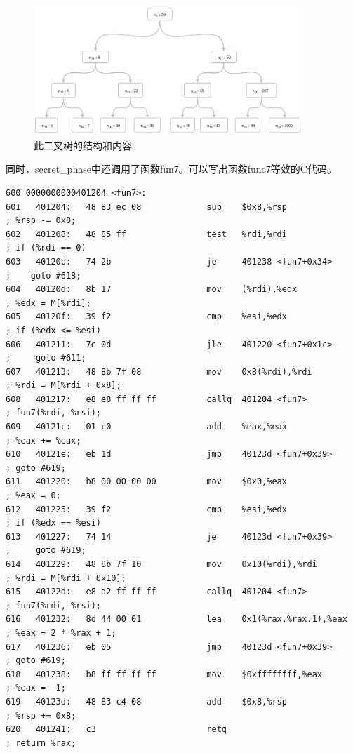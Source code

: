 \documentclass{article}
\begin{document}
\begin{figure}[H]
  \begin{center}
    \includegraphics[width=0.9\textwidth]{tree.png}
    \caption{此二叉树的结构和内容}
  \end{center}
\end{figure}

同时，secret\_phase中还调用了函数fun7。可以写出函数func7等效的C代码。

\begin{lstlisting}[title = fun7对应的反汇编代码及注释, xleftmargin = 2em,xrightmargin = 2em, aboveskip = 1em, numbers = none, basicstyle=\footnotesize\ttfamily]
600 0000000000401204 <fun7>:
601   401204:   48 83 ec 08             sub    $0x8,%rsp                    ; %rsp -= 0x8;
602   401208:   48 85 ff                test   %rdi,%rdi                    ; if (%rdi == 0)
603   40120b:   74 2b                   je     401238 <fun7+0x34>           ;    goto #618;
604   40120d:   8b 17                   mov    (%rdi),%edx                  ; %edx = M[%rdi];
605   40120f:   39 f2                   cmp    %esi,%edx                    ; if (%edx <= %esi)
606   401211:   7e 0d                   jle    401220 <fun7+0x1c>           ;     goto #611;
607   401213:   48 8b 7f 08             mov    0x8(%rdi),%rdi               ; %rdi = M[%rdi + 0x8];
608   401217:   e8 e8 ff ff ff          callq  401204 <fun7>                ; fun7(%rdi, %rsi);
609   40121c:   01 c0                   add    %eax,%eax                    ; %eax += %eax;
610   40121e:   eb 1d                   jmp    40123d <fun7+0x39>           ; goto #619;
611   401220:   b8 00 00 00 00          mov    $0x0,%eax                    ; %eax = 0;
612   401225:   39 f2                   cmp    %esi,%edx                    ; if (%edx == %esi)
613   401227:   74 14                   je     40123d <fun7+0x39>           ;     goto #619;
614   401229:   48 8b 7f 10             mov    0x10(%rdi),%rdi              ; %rdi = M[%rdi + 0x10];
615   40122d:   e8 d2 ff ff ff          callq  401204 <fun7>                ; fun7(%rdi, %rsi);
616   401232:   8d 44 00 01             lea    0x1(%rax,%rax,1),%eax        ; %eax = 2 * %rax + 1;
617   401236:   eb 05                   jmp    40123d <fun7+0x39>           ; goto #619;
618   401238:   b8 ff ff ff ff          mov    $0xffffffff,%eax             ; %eax = -1;
619   40123d:   48 83 c4 08             add    $0x8,%rsp                    ; %rsp += 0x8;
620   401241:   c3                      retq                                ; return %rax;
\end{lstlisting}
\end{document}
